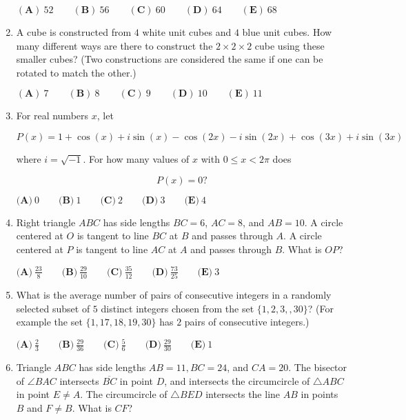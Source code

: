 \documentclass{article}
\begin{document}
\begin{enumerate}[label=\arabic*., itemsep=0.5em]
\((\textbf{A})\: 52\qquad(\textbf{B}) \: 56\qquad(\textbf{C}) \: 60\qquad(\textbf{D}) \: 64\qquad(\textbf{E}) \: 68\)\par \vspace{0.5em}\item A cube is constructed from \(4\) white unit cubes and \(4\) blue unit cubes. How many different ways are there to construct the \(2 \times 2 \times 2\) cube using these smaller cubes? (Two constructions are considered the same if one can be rotated to match the other.)

\((\textbf{A})\: 7\qquad(\textbf{B}) \: 8\qquad(\textbf{C}) \: 9\qquad(\textbf{D}) \: 10\qquad(\textbf{E}) \: 11\)\par \vspace{0.5em}\item For real numbers \(x\), let 

\begin{equation*}
P(x)=1+\cos(x)+i\sin(x)-\cos(2x)-i\sin(2x)+\cos(3x)+i\sin(3x)
\end{equation*}

where \(i = \sqrt{-1}\). For how many values of \(x\) with \(0\leq x<2\pi\) does 

\begin{equation*}
P(x)=0?
\end{equation*}


\(\textbf{(A)}\ 0 \qquad\textbf{(B)}\  1 \qquad\textbf{(C)}\  2 \qquad\textbf{(D)}\
3 \qquad\textbf{(E)}\ 4\)\par \vspace{0.5em}\item Right triangle \(ABC\) has side lengths \(BC=6\), \(AC=8\), and \(AB=10\). A circle centered at \(O\) is tangent to line \(BC\) at \(B\) and passes through \(A\). A circle centered at \(P\) is tangent to line \(AC\) at \(A\) and passes through \(B\). What is \(OP\)?

\(\textbf{(A)}\ \frac{23}{8} \qquad\textbf{(B)}\  \frac{29}{10} \qquad\textbf{(C)}\  \frac{35}{12} \qquad\textbf{(D)}\
\frac{73}{25} \qquad\textbf{(E)}\ 3\)\par \vspace{0.5em}\item What is the average number of pairs of consecutive integers in a randomly selected subset of \(5\) distinct integers chosen from the set \(\{ 1, 2, 3, , 30\}\)? (For example the set \(\{1, 17, 18, 19, 30\}\) has \(2\) pairs of consecutive integers.)

\(\textbf{(A)}\ \frac{2}{3} \qquad\textbf{(B)}\ \frac{29}{36} \qquad\textbf{(C)}\ \frac{5}{6} \qquad\textbf{(D)}\
\frac{29}{30} \qquad\textbf{(E)}\ 1\)\par \vspace{0.5em}\item Triangle \(ABC\) has side lengths \(AB = 11, BC=24\), and \(CA = 20\). The bisector of \(\angle{BAC}\) intersects \(\overline{BC}\) in point \(D\), and intersects the circumcircle of \(\triangle{ABC}\) in point \(E \ne A\). The circumcircle of \(\triangle{BED}\) intersects the line \(AB\) in points \(B\) and \(F \ne B\). What is \(CF\)?


\end{enumerate}
\end{document}
